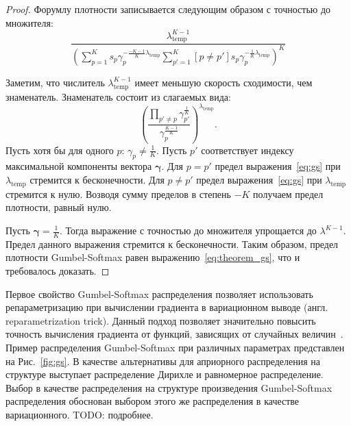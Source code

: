 \begin{proof} 
Форумлу плотности записывается следующим образом с точностью до множителя:
\[
       \frac{\lambda_{\text{temp}}^{K-1}}{\left(\sum_{p=1}^K s_p\gamma_p^{-\frac{-K-1}{K}\lambda_\text{temp}}\sum_{p'=1}^K [p \neq p']s_p\gamma_p^{-\frac{1}{K}\lambda_\text{temp}}\right)^{K}}
\]


Заметим, что числитель $\lambda_{\text{temp}}^{K-1}$ имеет меньшую скорость сходимости, чем знаменатель. 
Знаменатель состоит из слагаемых вида:
\begin{equation}
\label{eq:gs}
    \left(\frac{\prod_{p' \neq p} \gamma_{p'}^{\frac{1}{K}}}{\gamma_p^{\frac{K-1}{K}}}\right)^{\lambda_{\text{temp}}}.
\end{equation}
Пусть хотя бы для одного $p$: $\gamma_p \neq \frac{1}{K}$. Пусть $p'$ соответствует индексу максимальной компоненты вектора $\boldsymbol{\gamma}$.
Для $p=p'$ предел выражения~\eqref{eq:gs} при $\lambda_{\text{temp}}$ стремится к бесконечности. Для $p\neq p'$ предел выражения~\eqref{eq:gs} при $\lambda_{\text{temp}}$ стремится к нулю. Возводя сумму пределов в степень $-K$ получаем предел плотности, равный нулю.

Пусть $\boldsymbol{\gamma} = \frac{1}{K}$.
Тогда выражение с точностью до множителя упрощается до $\lambda^{K-1}$. Предел данного выражения стремится к бесконечности.
Таким образом, предел плотности Gumbel-Softmax равен выражению~\eqref{eq:theorem_gs}, что и требовалось доказать.

\end{proof}


Первое свойство Gumbel-Softmax распределения позволяет использовать репараметризацию при вычислении градиента в вариационном выводе (англ. reparametrization trick). Данный подход позволяет значительно повысить точность вычисления градиента от функций, зависящих от случайных величин~\cite{reparametrization}.
Пример распределения Gumbel-Softmax при различных параметрах представлен на Рис.~\ref{fig:gs}. В качестве альтернативы для априорного распределения на структуре выступает  распределение Дирихле и равномерное распределение. Выбор в качестве распределения на структуре произведения Gumbel-Softmax распределения обоснован выбором этого же распределения в качестве вариационного. TODO: подробнее.

